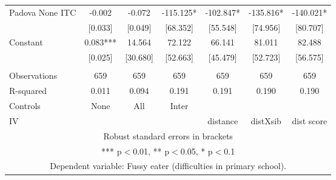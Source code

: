 \begin{tabular}{lcccccc}
Padova None ITC & -0.002 & -0.072 & -115.125* & -102.847* & -135.816* & -140.021* \\
 & [0.033] & [0.049] & [68.352] & [55.548] & [74.956] & [80.707] \\
Constant & 0.083*** & 14.564 & 72.122 & 66.141 & 81.011 & 82.488 \\
 & [0.025] & [30.680] & [52.663] & [45.479] & [52.723] & [56.575] \\
 &  &  &  &  &  &  \\
Observations & 659 & 659 & 659 & 659 & 659 & 659 \\
R-squared & 0.011 & 0.094 & 0.191 & 0.191 & 0.190 & 0.190 \\
Controls & None & All & Inter &  &  &  \\
 IV &  &  &  & distance & distXsib & dist score \\ \hline
\multicolumn{7}{c}{ Robust standard errors in brackets} \\
\multicolumn{7}{c}{ *** p$<$0.01, ** p$<$0.05, * p$<$0.1} \\
\multicolumn{7}{c}{ Dependent variable: Fussy eater (difficulties in primary school).} \\
\end{tabular}
